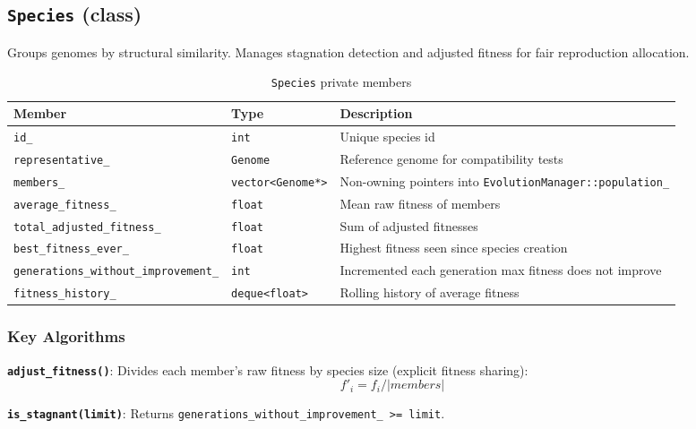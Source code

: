 \subsection{\texttt{Species} (class)}

Groups genomes by structural similarity.  Manages stagnation detection and adjusted
fitness for fair reproduction allocation.

\begin{table}[H]
\centering\small
\caption{\texttt{Species} private members}
\begin{tabularx}{\textwidth}{@{}llX@{}}
\toprule
\textbf{Member} & \textbf{Type} & \textbf{Description} \\
\midrule
\texttt{id\_}                           & \texttt{int}            & Unique species id \\
\texttt{representative\_}               & \texttt{Genome}         & Reference genome for compatibility tests \\
\texttt{members\_}                      & \texttt{vector<Genome*>}& Non-owning pointers into \texttt{EvolutionManager::population\_} \\
\texttt{average\_fitness\_}             & \texttt{float}          & Mean raw fitness of members \\
\texttt{total\_adjusted\_fitness\_}     & \texttt{float}          & Sum of adjusted fitnesses \\
\texttt{best\_fitness\_ever\_}          & \texttt{float}          & Highest fitness seen since species creation \\
\texttt{generations\_without\_improvement\_} & \texttt{int}       & Incremented each generation max fitness does not improve \\
\texttt{fitness\_history\_}             & \texttt{deque<float>}   & Rolling history of average fitness \\
\bottomrule
\end{tabularx}
\end{table}

\subsubsection{Key Algorithms}

\textbf{\texttt{adjust\_fitness()}}: Divides each member's raw fitness by species size
(explicit fitness sharing):
\[
  f'_i = f_i / |\mathit{members}|
\]

\textbf{\texttt{is\_stagnant(limit)}}: Returns
\texttt{generations\_without\_improvement\_ >= limit}.

